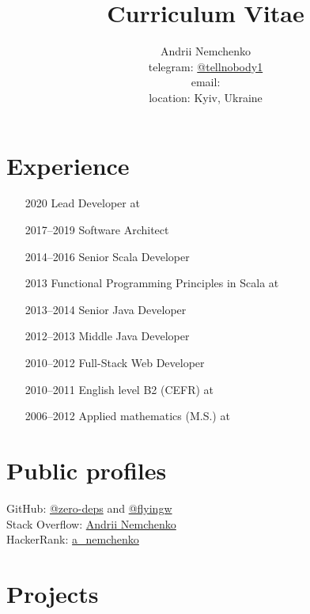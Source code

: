 

\title{Curriculum Vitae}
\author{
  Andrii Nemchenko\\
  telegram: \href{https://t.me/tellnobody1}{@tellnobody1}\\
  email: \\
  location: Kyiv, Ukraine
}
\maketitle

\section{Experience}
\begin{itemize}
  \item[2020] Lead Developer at 
  \item[2017–2019] Software Architect
  \item[2014–2016] Senior Scala Developer
  \item[2013] Functional Programming Principles in Scala at 
  \item[2013–2014] Senior Java Developer
  \item[2012–2013] Middle Java Developer
  \item[2010–2012] Full-Stack Web Developer
  \item[2010–2011] English level B2 (CEFR) at 
  \item[2006–2012] Applied mathematics (M.S.) at 
\end{itemize}

\section{Public profiles}
GitHub:
\href{https://github.com/zero-deps}{@zero-deps} and
\href{https://github.com/flyingw}{@flyingw} \\
Stack Overflow:
\href{https://stackoverflow.com/users/355491}{Andrii Nemchenko} \\
HackerRank:
\href{https://www.hackerrank.com/a\_nemchenko}{a\_nemchenko}

\pagebreak

\section{Projects}
